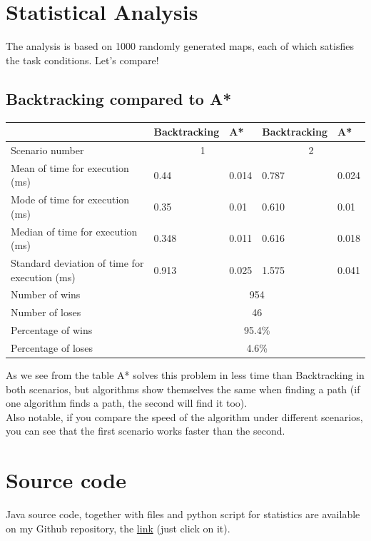 \documentclass[a4paper]{article}
\begin{document}
\section{Statistical Analysis}
The analysis is based on 1000 randomly generated maps, each of which satisfies the task conditions. Let's compare!
\subsection*{Backtracking compared to A*} 

\begin{center}
\begin{tabular}{ |p{5cm}|p{2cm}|p{2cm}|p{2cm}|p{2cm}| }
    \hline
    & Backtracking&A*&Backtracking&A*\\
    \hline
    Scenario number&\multicolumn{2}{|c|}{1} & \multicolumn{2}{|c|}{2}\\
    \hline
    Mean of time for execution (ms)& 0.44 & 0.014 &0.787& 0.024\\
    Mode of time for execution (ms) & 0.35  & 0.01&0.610& 0.01\\
    Median of time for execution (ms)& 0.348 & 0.011&0.616& 0.018\\
    Standard deviation of time for execution (ms) & 0.913 & 0.025&1.575& 0.041\\
    \hline
    Number of wins & \multicolumn{4}{|c|}{954} \\
    Number of loses & \multicolumn{4}{|c|}{46}  \\
    Percentage of wins & \multicolumn{4}{|c|}{95.4\%} \\
    Percentage of loses & \multicolumn{4}{|c|}{4.6\%} \\
    \hline
\end{tabular}
\end{center}
As we see from the table A* solves this problem in less time than Backtracking in both scenarios, but algorithms show themselves the same when finding a path (if one algorithm finds a path, the second will find it too).\\
Also notable, if you compare the speed of the algorithm under different scenarios, you can see that the first scenario works faster than the second.

\section{Source code}
Java source code, together with files and python script for statistics are available on my Github repository, the \href{https://github.com/NAD777/AI-assignment-1}{link} (just click on it).
\end{document}
